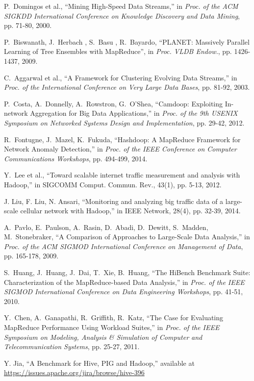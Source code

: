 \documentclass[10pt, conference, letterpaper]{IEEEtran}
\begin{document}
\begin{thebibliography}{99}
P.~Domingos et al., ``Mining High-Speed Data Streams,'' in \emph{Proc. of the ACM SIGKDD International Conference on Knowledge Discovery and Data Mining}, pp. 71-80, 2000.

P.~Biswanath, J.~Herbach , S.~Basu , R.~Bayardo, ``PLANET: Massively Parallel Learning of Tree Ensembles with MapReduce'', in \emph{Proc. VLDB Endow.}, pp. 1426-1437, 2009.

C.~Aggarwal et al., ``A Framework for Clustering Evolving Data Streams,'' in \emph{Proc. of the International Conference on Very Large Data Bases}, pp. 81-92, 2003.

P.~Costa, A.~Donnelly, A.~Rowstron, G.~O'Shea, ``Camdoop: Exploiting In-network Aggregation for Big Data Applications,'' in \emph{Proc. of the 9th USENIX Symposium on Networked Systems Design and Implementation}, pp. 29-42, 2012.

R.~Fontugne, J.~Mazel, K.~Fukuda, ``Hashdoop: A MapReduce Framework for Network Anomaly Detection,'' in \emph{Proc. of the IEEE Conference on Computer Communications Workshops}, pp. 494-499, 2014. 

Y.~Lee et al., ``Toward scalable internet traffic measurement and analysis with Hadoop,'' in SIGCOMM Comput. Commun. Rev., 43(1), pp. 5-13, 2012.

J. Liu, F. Liu, N. Ansari, ``Monitoring and analyzing big traffic data of a large-scale cellular network with Hadoop,'' in IEEE Network, 28(4), pp. 32-39, 2014.

A.~Pavlo, E.~Paulson, A.~Rasin, D.~Abadi, D.~Dewitt, S.~Madden, M.~Stonebraker, ``A Comparison of Approaches to Large-Scale Data Analysis,'' in \emph{Proc. of the ACM SIGMOD International Conference on Management of Data}, pp. 165-178, 2009.

S.~Huang, J.~Huang, J.~Dai, T.~Xie, B.~Huang, ``The HiBench Benchmark Suite: Characterization of the MapReduce-based Data Analysis,'' in \emph{Proc. of the IEEE SIGMOD International Conference on Data Engineering Workshops}, pp. 41-51, 2010.

Y.~Chen, A.~Ganapathi, R.~Griffith, R.~Katz, ``The Case for Evaluating MapReduce Performance Using Workload Suites,'' in \emph{Proc. of the IEEE Symposium on Modeling, Analysis \& Simulation of Computer and Telecommunication Systems}, pp. 25-27, 2011.

Y. Jia, ``A Benchmark for Hive, PIG and Hadoop,'' available at \url{https://issues.apache.org/jira/browse/hive-396}


\end{thebibliography}
\end{document}
